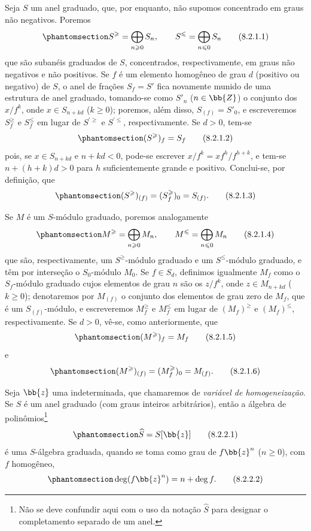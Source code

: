 \documentclass[oneside,10pt]{amsart}
\renewcommand{\leq}{\leqslant}
\renewcommand{\geq}{\geqslant}
\newcommand{\oldpage}[2][]{\marginnote{\normalfont\footnotesize\textbf{#1}~|~#2}\ignorespaces}
\let\EGAOriginalLabel\label
\renewcommand{\label}[1]{\phantomsection\EGAOriginalLabel{#1}}
\begin{document}
\begin{env}[8.2.1]
\label{II.8.2.1}
Seja $S$ um anel graduado, que, por enquanto, não supomos concentrado em graus não negativos.
Poremos
\[
\label{II.8.2.1.1}
  S^\geq=\bigoplus_{n\geq0}S_n,
  \qquad
  S^\leq=\bigoplus_{n\leq0}S_n
\tag{8.2.1.1}
\]
que são subanéis graduados de $S$, concentrados, respectivamente, em graus não negativos e não positivos.
Se $f$ é um elemento homogêneo de grau $d$ (positivo ou negativo) de $S$, o anel de frações $S_f=S'$ fica novamente munido de uma estrutura de anel graduado, tomando-se como $S'_n$ ($n\in\bb{Z}$) o conjunto dos $x/f^k$, onde $x\in S_{n+kd}$ ($k\geq0$);
poremos, além disso, $S_{(f)}=S'_0$, e escreveremos $S_f^\geq$ e $S_f^\leq$ em lugar de $S^{\prime\geq}$ e $S^{\prime\leq}$, respectivamente.
Se $d>0$, tem-se
\[
\label{II.8.2.1.2}
  (S^\geq)_f=S_f
\tag{8.2.1.2}
\]
pois, se $x\in S_{n+kd}$ e $n+kd<0$, pode-se escrever $x/f^k=xf^h/f^{h+k}$, e tem-se $n+(h+k)d>0$ para $h$ suficientemente grande e positivo.
Conclui-se, por definição, que
\[
\label{II.8.2.1.3}
  (S^\geq)_{(f)}=(S_f^\geq)_0=S_{(f)}.
\tag{8.2.1.3}
\]

Se $M$ é um $S$-módulo graduado, poremos analogamente
\[
\label{II.8.2.1.4}
  M^\geq=\bigoplus_{n\geq0}M_n,
  \qquad
  M^\leq=\bigoplus_{n\leq0}M_n
\tag{8.2.1.4}
\]
que são, respectivamente, um $S^\geq$-módulo graduado e um $S^\leq$-módulo graduado, e têm por interseção o $S_0$-módulo $M_0$.
Se $f\in S_d$, definimos igualmente $M_f$ como o $S_f$-módulo graduado cujos elementos de grau $n$ são os $z/f^k$, onde $z\in M_{n+kd}$ ($k\geq0$);
denotaremos por $M_{(f)}$ o conjunto dos elementos de grau zero de $M_f$, que é um $S_{(f)}$-módulo, e escreveremos $M_f^\geq$ e $M_f^\leq$ em lugar de $(M_f)^\geq$ e $(M_f)^\leq$, respectivamente.
Se $d>0$, vê-se, como anteriormente, que
\[
\label{II.8.2.1.5}
  (M^\geq)_f=M_f
\tag{8.2.1.5}
\]
e
\[
\label{II.8.2.1.6}
  (M^\geq)_{(f)}=(M_f^\geq)_0=M_{(f)}.
\tag{8.2.1.6}
\]
\end{env}

\begin{env}[8.2.2]
\label{II.8.2.2}
Seja $\bb{z}$ uma indeterminada, que chamaremos de \emph{variável de homogeneização}.
Se $S$ é um anel graduado (com graus inteiros arbitrários), então a álgebra de polinômios\footnote{Não se deve confundir aqui com o uso da notação $\widehat{S}$ para designar o completamento separado de um anel.}
\[
\label{II.8.2.2.1}
  \widehat{S}=S[\bb{z}]
\tag{8.2.2.1}
\]
\oldpage[II]{158}
é uma $S$-álgebra graduada, quando se toma como grau de $f\bb{z}^n$ ($n\geq0$), com $f$ homogêneo,
\[
\label{II.8.2.2.2}
  \deg(f\bb{z}^n)=n+\deg f.
\tag{8.2.2.2}
\]
\end{env}
\end{document}
